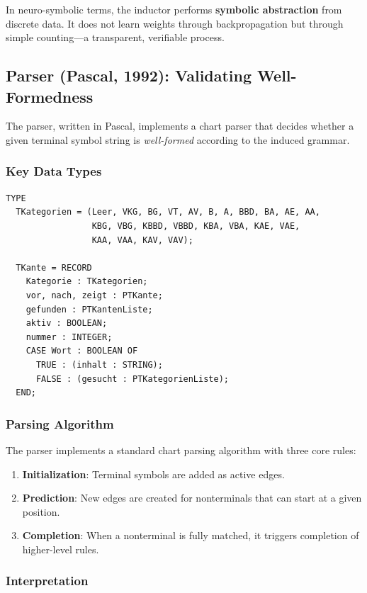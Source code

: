 \documentclass[12pt,a4paper]{article}
\begin{document}
In neuro-symbolic terms, the inductor performs \textbf{symbolic abstraction} 
from discrete data. It does not learn weights through backpropagation but 
through simple counting—a transparent, verifiable process.

\subsection{Parser (Pascal, 1992): Validating Well-Formedness}

The parser, written in Pascal, implements a chart parser that decides whether 
a given terminal symbol string is \textit{well-formed} according to the 
induced grammar.

\subsubsection{Key Data Types}

\begin{lstlisting}[caption=Parser Data Structures in Pascal]
TYPE
  TKategorien = (Leer, VKG, BG, VT, AV, B, A, BBD, BA, AE, AA,
                 KBG, VBG, KBBD, VBBD, KBA, VBA, KAE, VAE,
                 KAA, VAA, KAV, VAV);
  
  TKante = RECORD
    Kategorie : TKategorien;
    vor, nach, zeigt : PTKante;
    gefunden : PTKantenListe;
    aktiv : BOOLEAN;
    nummer : INTEGER;
    CASE Wort : BOOLEAN OF
      TRUE : (inhalt : STRING);
      FALSE : (gesucht : PTKategorienListe);
  END;
\end{lstlisting}

\subsubsection{Parsing Algorithm}

The parser implements a standard chart parsing algorithm with three core rules:

\begin{enumerate}
    \item \textbf{Initialization}: Terminal symbols are added as active edges.
    \item \textbf{Prediction}: New edges are created for nonterminals that can 
    start at a given position.
    \item \textbf{Completion}: When a nonterminal is fully matched, it triggers 
    completion of higher-level rules.
\end{enumerate}

\subsubsection{Interpretation}
\end{document}

